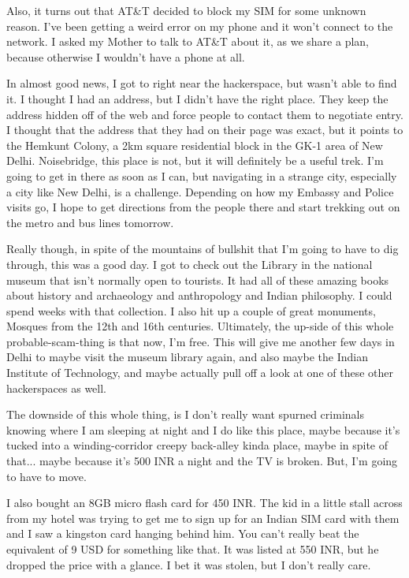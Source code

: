 \documentclass[11pt]{amsart}
\begin{document}
Also, it turns out that AT\&T decided to block my SIM for some unknown reason. I've been getting a weird error on my phone and it won't connect to the network. I asked my Mother to talk to AT\&T about it, as we share a plan, because otherwise I wouldn't have a phone at all.

In almost good news, I got to right near the hackerspace, but wasn't able to find it. I thought I had an address, but I didn't have the right place. They keep the address hidden off of the web and force people to contact them to negotiate entry. I thought that the address that they had on their page was exact, but it points to the Hemkunt Colony, a 2km square residential block in the GK-1 area of New Delhi. Noisebridge, this place is not, but it will definitely be a useful trek. I'm going to get in there as soon as I can, but navigating in a strange city, especially a city like New Delhi, is a challenge. Depending on how my Embassy and Police visits go, I hope to get directions from the people there and start trekking out on the metro and bus lines tomorrow.

Really though, in spite of the mountains of bullshit that I'm going to have to dig through, this was a good day. I got to check out the Library in the national museum that isn't normally open to tourists. It had all of these amazing books about history and archaeology and anthropology and Indian philosophy. I could spend weeks with that collection. I also hit up a couple of great monuments, Mosques from the 12th and 16th centuries.  Ultimately, the up-side of this whole probable-scam-thing is that now, I'm free. This will give me another few days in Delhi to maybe visit the museum library again, and also maybe the Indian Institute of Technology, and maybe actually pull off a look at one of these other hackerspaces as well.

The downside of this whole thing, is I don't really want spurned criminals knowing where I am sleeping at night and I do like this place, maybe because it's tucked into a winding-corridor creepy back-alley kinda place, maybe in spite of that...  maybe because it's 500 INR a night and the TV is broken. But, I'm going to have to move.

I also bought an 8GB micro flash card for 450 INR. The kid in a little stall across from my hotel was trying to get me to sign up for an Indian SIM card with them and I saw a kingston card hanging behind him. You can't really beat the equivalent of 9 USD for something like that.  It was listed at 550 INR, but he dropped the price with a glance. I bet it was stolen, but I don't really care. 
\end{document}
